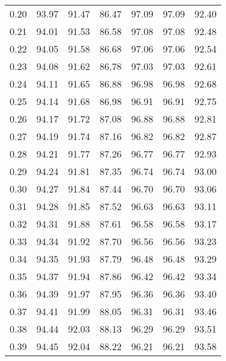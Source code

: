 \begin{tabular}{|c|c|c|c|c|c|c|}
      0.20 &     93.97 &     91.47 &      86.47 &   97.09 &      97.09 &         92.40 \\
      0.21 &     94.01 &     91.53 &      86.58 &   97.08 &      97.08 &         92.48 \\
      0.22 &     94.05 &     91.58 &      86.68 &   97.06 &      97.06 &         92.54 \\
      0.23 &     94.08 &     91.62 &      86.78 &   97.03 &      97.03 &         92.61 \\
      0.24 &     94.11 &     91.65 &      86.88 &   96.98 &      96.98 &         92.68 \\
      0.25 &     94.14 &     91.68 &      86.98 &   96.91 &      96.91 &         92.75 \\
      0.26 &     94.17 &     91.72 &      87.08 &   96.88 &      96.88 &         92.81 \\
      0.27 &     94.19 &     91.74 &      87.16 &   96.82 &      96.82 &         92.87 \\
      0.28 &     94.21 &     91.77 &      87.26 &   96.77 &      96.77 &         92.93 \\
      0.29 &     94.24 &     91.81 &      87.35 &   96.74 &      96.74 &         93.00 \\
      0.30 &     94.27 &     91.84 &      87.44 &   96.70 &      96.70 &         93.06 \\
      0.31 &     94.28 &     91.85 &      87.52 &   96.63 &      96.63 &         93.11 \\
      0.32 &     94.31 &     91.88 &      87.61 &   96.58 &      96.58 &         93.17 \\
      0.33 &     94.34 &     91.92 &      87.70 &   96.56 &      96.56 &         93.23 \\
      0.34 &     94.35 &     91.93 &      87.79 &   96.48 &      96.48 &         93.29 \\
      0.35 &     94.37 &     91.94 &      87.86 &   96.42 &      96.42 &         93.34 \\
      0.36 &     94.39 &     91.97 &      87.95 &   96.36 &      96.36 &         93.40 \\
      0.37 &     94.41 &     91.99 &      88.05 &   96.31 &      96.31 &         93.46 \\
      0.38 &     94.44 &     92.03 &      88.13 &   96.29 &      96.29 &         93.51 \\
      0.39 &     94.45 &     92.04 &      88.22 &   96.21 &      96.21 &         93.58 \\

\end{tabular}
